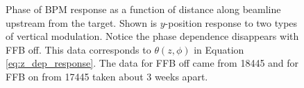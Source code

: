 \begin{figure}[ht]
\centering
{}
\caption{Phase of BPM response as a function of distance along beamline upstream from the target. Shown is $y$-position response to two types of vertical modulation.  Notice the phase dependence disappears with FFB off.  This data corresponds to $\theta (z,\phi)$ in Equation \ref{eq:z_dep_response}. The data for FFB off came from 18445 and for FFB on from 17445 taken about 3 weeks apart.}
\label{fig:bpm_phase_vs_z_ymod}
\end{figure}

